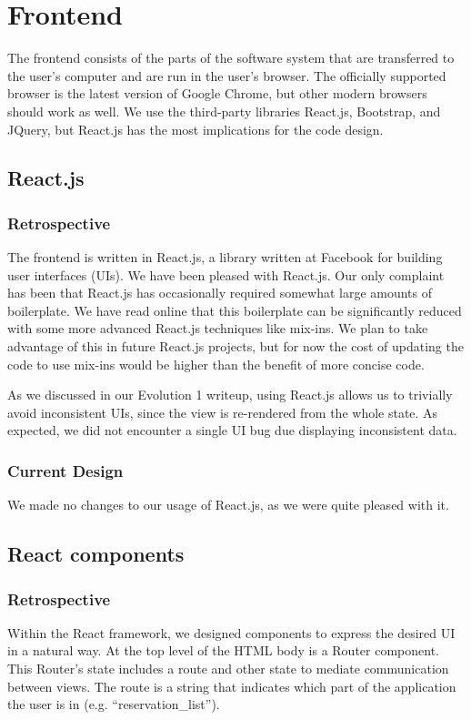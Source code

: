 \documentclass[12pt]{article}
\begin{document}
\section{Frontend}
\label{sec:Frontend}
The frontend consists of the parts of the software system that are transferred to the user's computer and are run in the user's browser. The officially supported browser is the latest version of Google Chrome, but other modern browsers should work as well. We use the third-party libraries React.js, Bootstrap, and JQuery, but React.js has the most implications for the code design.

\subsection{React.js}
\subsubsection{Retrospective}
The frontend is written in React.js, a library written at Facebook for building user interfaces (UIs). We have been pleased with React.js. Our only complaint has been that React.js has occasionally required somewhat large amounts of boilerplate. We have read online that this boilerplate can be significantly reduced with some more advanced React.js techniques like mix-ins. We plan to take advantage of this in future React.js projects, but for now the cost of updating the code to use mix-ins would be higher than the benefit of more concise code.

As we discussed in our Evolution 1 writeup, using React.js allows us to trivially avoid inconsistent UIs, since the view is re-rendered from the whole state. As expected, we did not encounter a single UI bug due displaying inconsistent data.

\subsubsection{Current Design}
We made no changes to our usage of React.js, as we were quite pleased with it.

\subsection{React components}
\subsubsection{Retrospective}
Within the React framework, we designed components to express the desired UI in a natural way. At the top level of the HTML body is a Router component. This Router's state includes a route and other state to mediate communication between views. The route is a string that indicates which part of the application the user is in (e.g. ``reservation\_list'').
\end{document}

